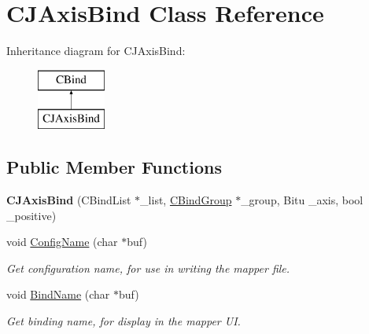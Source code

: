 \hypertarget{classCJAxisBind}{\section{C\-J\-Axis\-Bind Class Reference}
\label{classCJAxisBind}
}
Inheritance diagram for C\-J\-Axis\-Bind\-:\begin{figure}[H]
\begin{center}
\leavevmode
\includegraphics[height=2.000000cm]{classCJAxisBind}
\end{center}
\end{figure}
\subsection*{Public Member Functions}
\begin{DoxyCompactItemize}
\item 
\hypertarget{classCJAxisBind_aebf1190a6d2e50ab976a61083be5e85b}{{\bfseries C\-J\-Axis\-Bind} (C\-Bind\-List $\ast$\-\_\-list, \hyperlink{classCBindGroup}{C\-Bind\-Group} $\ast$\-\_\-group, Bitu \-\_\-axis, bool \-\_\-positive)}\label{classCJAxisBind_aebf1190a6d2e50ab976a61083be5e85b}

\item 
\hypertarget{classCJAxisBind_a177d6d9c27c002c88b1a05cd3d31d065}{void \hyperlink{classCJAxisBind_a177d6d9c27c002c88b1a05cd3d31d065}{Config\-Name} (char $\ast$buf)}\label{classCJAxisBind_a177d6d9c27c002c88b1a05cd3d31d065}

\begin{DoxyCompactList}\small\item\em Get configuration name, for use in writing the mapper file. \end{DoxyCompactList}\item 
\hypertarget{classCJAxisBind_aec1508a8f00bb7b5f4aa5a42c33fe973}{void \hyperlink{classCJAxisBind_aec1508a8f00bb7b5f4aa5a42c33fe973}{Bind\-Name} (char $\ast$buf)}\label{classCJAxisBind_aec1508a8f00bb7b5f4aa5a42c33fe973}

\begin{DoxyCompactList}\small\item\em Get binding name, for display in the mapper U\-I. \end{DoxyCompactList}\end{DoxyCompactItemize}
